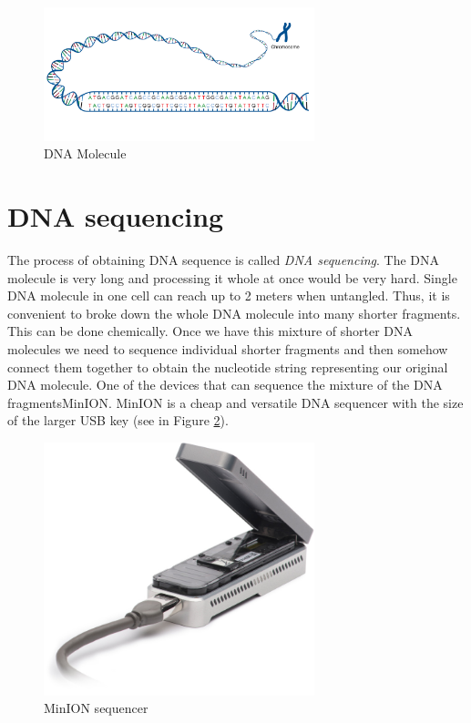 \begin{figure}
\centerline{\includegraphics[width=0.7\textwidth, height=0.3\textheight]{images/acgt}}
\caption[DNA]{DNA Molecule}
\label{obr:acgt}
\end{figure}

\section{DNA sequencing}

The process of obtaining DNA sequence is called \textit{DNA sequencing}.
The DNA molecule is very long and processing it whole at once would be very hard.
Single DNA molecule in one cell can reach up to 2 meters when untangled.
Thus, it is convenient to broke down the whole DNA molecule into many shorter fragments.
This can be done chemically. Once we have this mixture of shorter DNA molecules we need to sequence individual
shorter fragments and then somehow connect them together to obtain the nucleotide string representing
our original DNA molecule. One of the devices that can sequence the mixture of the
DNA fragmentsMinION\cite{lu2016oxford}. MinION is a cheap and versatile DNA sequencer
with the size of the larger USB key (see in Figure \ref{obr:minIon}).

\begin{figure}
\centerline{\includegraphics[width=0.7\textwidth, height=0.3\textheight]{images/minion}}
\caption[MinION]{MinION sequencer}
\label{obr:minIon}
\end{figure}

